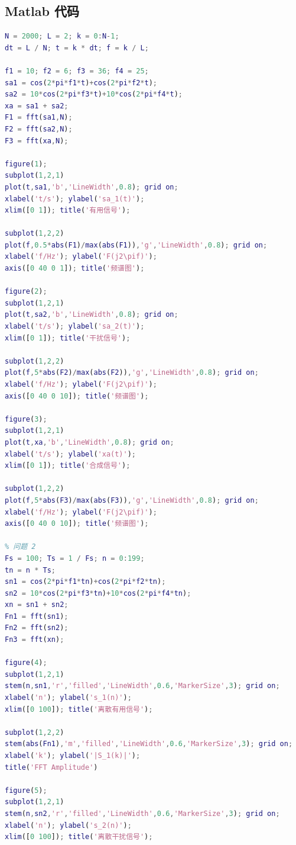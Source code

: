 \documentclass[12pt,AutoFakeBold]{article}
\begin{document}
%  
\newpage
\begin{appendices}  %
\section{Matlab 代码}

\begin{lstlisting}[language=Matlab]
% 问题 1
N = 2000; L = 2; k = 0:N-1;
dt = L / N; t = k * dt; f = k / L;

f1 = 10; f2 = 6; f3 = 36; f4 = 25;
sa1 = cos(2*pi*f1*t)+cos(2*pi*f2*t);
sa2 = 10*cos(2*pi*f3*t)+10*cos(2*pi*f4*t);
xa = sa1 + sa2;
F1 = fft(sa1,N);
F2 = fft(sa2,N);
F3 = fft(xa,N);

figure(1);
subplot(1,2,1)
plot(t,sa1,'b','LineWidth',0.8); grid on;
xlabel('t/s'); ylabel('sa_1(t)');
xlim([0 1]); title('有用信号');

subplot(1,2,2)
plot(f,0.5*abs(F1)/max(abs(F1)),'g','LineWidth',0.8); grid on;
xlabel('f/Hz'); ylabel('F(j2\pif)');
axis([0 40 0 1]); title('频谱图');

figure(2);
subplot(1,2,1)
plot(t,sa2,'b','LineWidth',0.8); grid on;
xlabel('t/s'); ylabel('sa_2(t)');
xlim([0 1]); title('干扰信号');

subplot(1,2,2)
plot(f,5*abs(F2)/max(abs(F2)),'g','LineWidth',0.8); grid on;
xlabel('f/Hz'); ylabel('F(j2\pif)');
axis([0 40 0 10]); title('频谱图');

figure(3);
subplot(1,2,1)
plot(t,xa,'b','LineWidth',0.8); grid on;
xlabel('t/s'); ylabel('xa(t)');
xlim([0 1]); title('合成信号');

subplot(1,2,2)
plot(f,5*abs(F3)/max(abs(F3)),'g','LineWidth',0.8); grid on;
xlabel('f/Hz'); ylabel('F(j2\pif)');
axis([0 40 0 10]); title('频谱图');

% 问题 2
Fs = 100; Ts = 1 / Fs; n = 0:199;
tn = n * Ts;
sn1 = cos(2*pi*f1*tn)+cos(2*pi*f2*tn);
sn2 = 10*cos(2*pi*f3*tn)+10*cos(2*pi*f4*tn);
xn = sn1 + sn2;
Fn1 = fft(sn1);
Fn2 = fft(sn2);
Fn3 = fft(xn);

figure(4);
subplot(1,2,1)
stem(n,sn1,'r','filled','LineWidth',0.6,'MarkerSize',3); grid on;
xlabel('n'); ylabel('s_1(n)');
xlim([0 100]); title('离散有用信号');

subplot(1,2,2)
stem(abs(Fn1),'m','filled','LineWidth',0.6,'MarkerSize',3); grid on;
xlabel('k'); ylabel('|S_1(k)|');
title('FFT Amplitude')

figure(5);
subplot(1,2,1)
stem(n,sn2,'r','filled','LineWidth',0.6,'MarkerSize',3); grid on;
xlabel('n'); ylabel('s_2(n)');
xlim([0 100]); title('离散干扰信号');


\end{lstlisting}
\end{appendices}
\end{document}
